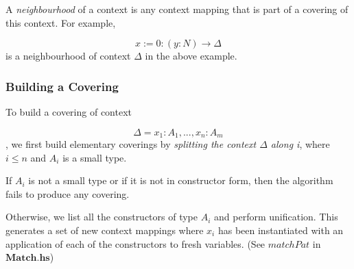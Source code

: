 A \textit{neighbourhood} of a context is any context mapping that is part of a covering of this context. For example, 

\[
  {x := 0} : (y : N) \to \Delta
\] is a neighbourhood of context $\Delta$ in the above example.

\subsubsection{Building a Covering}

To build a covering of context 

\[\Delta = x_1 : A_1, ..., x_n : A_m\], we first build elementary coverings by \textit{splitting the context $\Delta$ along i}, where $i \leq n$ and $A_i$ is a small type.

If $A_i$ is not a small type or if it is not in constructor form, then the algorithm fails to produce any covering.

Otherwise, we list all the constructors of type $A_i$ and perform unification. This generates a set of new context mappings where $x_i$ has been instantiated with an application of each of the constructors to fresh variables. (See $matchPat$ in $\boldsymbol{Match.hs}$)


